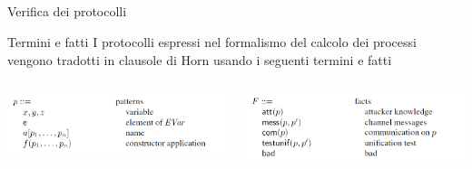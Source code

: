 \documentclass[11pt,xcolor=table]{beamer}
\begin{document}
\subsection{}
\begin{frame}{Verifica dei protocolli}
    \begin{block}{Termini e fatti}
        I protocolli espressi nel formalismo del calcolo dei processi vengono tradotti in clausole di Horn usando i seguenti termini e fatti
    \end{block}
    \vspace{1cm}
    \begin{columns}
        \begin{column}{0.55\textwidth}
            \includegraphics[scale=0.45]{Relazione/Immagini/rule.PNG}
        \end{column}
        
        \begin{column}{0.48\textwidth}
            \includegraphics[scale=0.4]{Relazione/Immagini/fatti.PNG}
        \end{column}
    \end{columns}
\end{frame}
\end{document}
